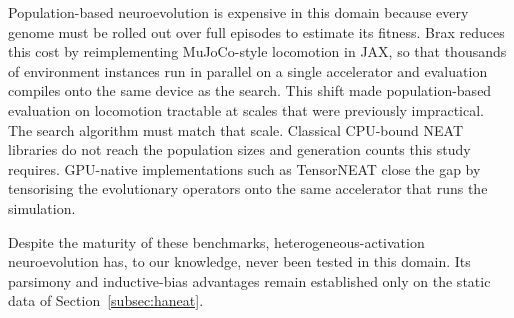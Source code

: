\documentclass[12pt]{article}
\begin{document}
Population-based neuroevolution is expensive in this domain because every genome must be rolled out over full episodes to estimate its fitness.
Brax \parencite{freeman_brax_2021} reduces this cost by reimplementing MuJoCo-style locomotion in JAX, so that thousands of environment instances run in parallel on a single accelerator and evaluation compiles onto the same device as the search.
This shift made population-based evaluation on locomotion tractable at scales that were previously impractical.
The search algorithm must match that scale.
Classical CPU-bound NEAT libraries do not reach the population sizes and generation counts this study requires.
GPU-native implementations such as TensorNEAT \parencite{wang_tensorized_2024} close the gap by tensorising the evolutionary operators onto the same accelerator that runs the simulation.

Despite the maturity of these benchmarks, heterogeneous-activation neuroevolution has, to our knowledge, never been tested in this domain. Its parsimony and inductive-bias advantages remain established only on the static data of Section~\ref{subsec:haneat}.



\end{document}
